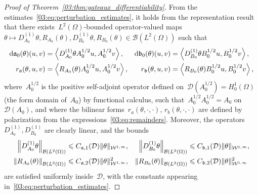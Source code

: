 \begin{proof}[Proof of Theorem~\ref{03:thm:gateaux_differentiability}]
    From the estimates~\eqref{03:eq:perturbation_estimates}, it holds from the representation result~\cite[Lemma VI.3.1]{K95} that there exists~$L^2(\Omega)$-bounded operator-valued maps~$\theta \mapsto D_{A_0}^{(1)}\theta,R_{A_0}(\theta),D_{B_0}^{(1)}\theta,R_{B_0}(\theta) \in \mathcal B(L^2(\Omega))$ such that
    \begin{equation}
        \label{03:eq:representation_formulae}
        \begin{aligned}
            \mathrm{d} \mathfrak{a}_0(\theta)(u,v) &= \left\langle D_{A_0}^{(1)}\theta A_0^{1/2}u,A_0^{1/2}v\right\rangle,&\mathrm{d} \mathfrak{b}_0(\theta)(u,v) &= \left\langle D_{B_0}^{(1)}\theta B_0^{1/2}u,B_0^{1/2}v\right\rangle,\\
            r_{\mathfrak{a}}(\theta,u,v) &= \left\langle R_{A_0}(\theta)A_0^{1/2}u,A_0^{1/2}v\right\rangle,&r_{\mathfrak{b}}(\theta,u,v) &=  \left\langle R_{B_0}(\theta)B_0^{1/2}u,B_0^{1/2}v\right\rangle,
        \end{aligned}
    \end{equation}
    where~$A_0^{1/2}$ is the positive self-adjoint operator defined on~$\mathcal D(A_0^{1/2}) = H_0^1(\Omega)$ (the form domain of~$A_0$) by functional calculus, such that~$A_0^{1/2}A_0^{1/2} = A_0$ on~$\mathcal D(A_0)$,
    and where the bilinear forms~$r_a(\theta,\cdot,\cdot),\,r_b(\theta,\cdot,\cdot)$ are defined by polarization from the expressions~\eqref{03:eq:remainders}.
    Moreover, the operators~$D_{A_0}^{(1)},D_{B_0}^{(1)}$ are clearly linear, and the bounds
    \begin{equation}
        \label{03:eq:perturbation_estimates_ops}
        \begin{aligned}
        \left\|D_{A_0}^{(1)}\theta\right\|_{\mathcal B(L^2(\Omega))} &\leqslant C_{\mathfrak{a},1}(\mathcal D) \|\theta\|_{{\mathcal{W}}^{1,\infty}},&\left\|D_{B_0}^{(1)}\theta\right\|_{\mathcal B(L^2(\Omega))} &\leqslant C_{\mathfrak{b},1}(\mathcal D) \|\theta\|_{{\mathcal{W}}^{1,\infty}},\\
        \left\|R_{A_0}(\theta)\right\|_{\mathcal B(L^2(\Omega))} &\leqslant C_{\mathfrak{a},2}(\mathcal D)\|\theta\|^2_{{\mathcal{W}}^{1,\infty}},&\left\|R_{B_0}(\theta)\right\|_{\mathcal B(L^2(\Omega))} &\leqslant C_{\mathfrak{b},2}(\mathcal D)\|\theta\|^2_{{\mathcal{W}}^{1,\infty}}
        \end{aligned}
    \end{equation}
    are satisfied uniformly inside~$\mathcal D$, with the constants appearing in~\eqref{03:eq:perturbation_estimates}.


\end{proof}
